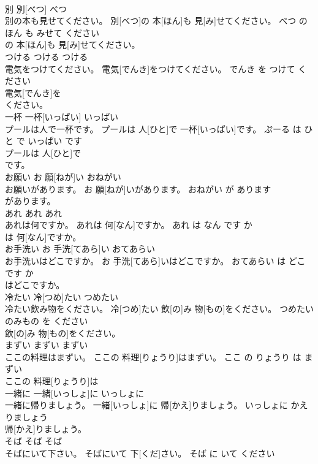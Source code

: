 \documentclass[8pt]{extreport}
\begin{document}
\begin{CJK}{UTF8}{min}
\\	別	別[べつ]	べつ	
\\	別の本も見せてください。	別[べつ]の 本[ほん]も 見[み]せてください。	べつ の ほん も みせて ください	
\\	の 本[ほん]も 見[み]せてください。			
\\	つける	つける	つける	
\\	電気をつけてください。	電気[でんき]をつけてください。	でんき を つけて ください	
\\	電気[でんき]を
\\	ください。			
\\	一杯	一杯[いっぱい]	いっぱい	
\\	プールは人で一杯です。	プールは 人[ひと]で 一杯[いっぱい]です。	ぷーる は ひと で いっぱい です	
\\	プールは 人[ひと]で
\\	です。			
\\	お願い	お 願[ねが]い	おねがい	
\\	お願いがあります。	お 願[ねが]いがあります。	おねがい が あります	
\\	があります。			
\\	あれ	あれ	あれ	
\\	あれは何ですか。	あれは 何[なん]ですか。	あれ は なん です か	
\\	は 何[なん]ですか。			
\\	お手洗い	お 手洗[てあら]い	おてあらい	
\\	お手洗いはどこですか。	お 手洗[てあら]いはどこですか。	おてあらい は どこ です か	
\\	はどこですか。			
\\	冷たい	冷[つめ]たい	つめたい	
\\	冷たい飲み物をください。	冷[つめ]たい 飲[の]み 物[もの]をください。	つめたい のみもの を ください	
\\	飲[の]み 物[もの]をください。			
\\	まずい	まずい	まずい	
\\	ここの料理はまずい。	ここの 料理[りょうり]はまずい。	ここ の りょうり は まずい	
\\	ここの 料理[りょうり]は
\\	一緒に	一緒[いっしょ]に	いっしょに	
\\	一緒に帰りましょう。	一緒[いっしょ]に 帰[かえ]りましょう。	いっしょに かえりましょう	
\\	帰[かえ]りましょう。			
\\	そば	そば	そば	
\\	そばにいて下さい。	そばにいて 下[くだ]さい。	そば に いて ください	

\end{CJK}
\end{document}
